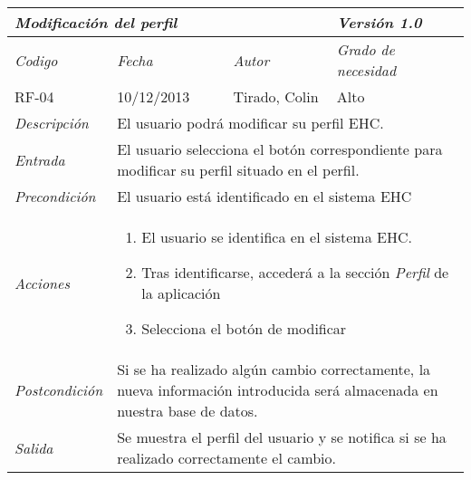\begin{center}
    \begin{tabular}{|p{3cm}|p{4cm}|p{4cm}|p{4cm}|}
    \hline \multicolumn{3}{|p{9cm}|}{\textit{Modificaci\'on del perfil}} & \textit{Versi\'on 1.0} \\
    \hline \textit{Codigo} & \textit{Fecha} & \textit{Autor} & \textit{Grado de necesidad} \\
    RF-04 & 10/12/2013 & Tirado, Colin & Alto \\
    \hline \textit{Descripci\'on} & \multicolumn{3}{|p{9cm}|}{El usuario podr\'a modificar su perfil EHC.} \\
    \hline \textit{Entrada} & \multicolumn{3}{|p{9cm}|}{El usuario selecciona el bot\'on correspondiente para modificar su perfil situado en el perfil.} \\
    \hline \textit{Precondici\'on} & \multicolumn{3}{|p{9cm}|}{El usuario est\'a identificado en el sistema EHC} \\
    \hline \textit{Acciones} & \multicolumn{3}{|p{9cm}|}{
    \begin{enumerate}
    \item El usuario se identifica en el sistema EHC.
    \item Tras identificarse, acceder\'a a la secci\'on \textit{Perfil} de la aplicaci\'on
    \item Selecciona el bot\'on de modificar
    \end{enumerate}
    } \\
    \hline \textit{Postcondici\'on} & \multicolumn{3}{|p{9cm}|}{Si se ha realizado alg\'un cambio correctamente, la nueva informaci\'on introducida ser\'a almacenada en nuestra base de datos.} \\
    \hline \textit{Salida} & \multicolumn{3}{|p{9cm}|}{Se muestra el perfil del usuario y se notifica si se ha realizado correctamente el cambio.} \\ \hline
    \end{tabular}
\end{center}
